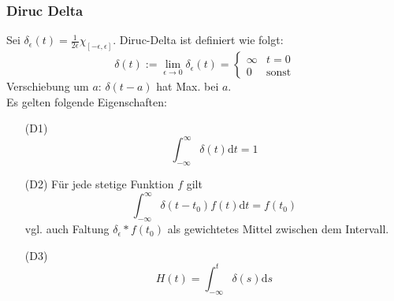 \documentclass[8pt, a4paper, landscape, fleqn]{scrartcl}
\def\d{\text{d}}
\begin{document}
\begin{multicols*}{3}
\begin{center}
\begin{tabular}{|c|c|}
            \hline
    	\end{tabular}
    	\end{center}
    	
		\subsubsection{Diruc Delta}
		Sei $\delta_\epsilon(t) = \frac{1}{2\epsilon}\chi_{[-\epsilon, \epsilon]}$. Diruc-Delta ist definiert wie folgt: $$\delta (t) := \lim_{\epsilon\to 0} \delta_\epsilon (t) = \begin{cases} \infty & t = 0 \\ 0 & \text{sonst}\end{cases}$$
		Verschiebung um $a$: $\delta (t-a)$ hat Max. bei $a$.\\
		Es gelten folgende Eigenschaften:
		\begin{itemize}[leftmargin=1cm]
              \item[(D1)] $$ \int_{-\infty}^\infty \delta(t) \d t = 1 $$
              \item[(D2)] Für jede stetige Funktion $f$ gilt $$ \int_{-\infty}^\infty \delta(t-t_0) f(t) \d t = f(t_0)$$ vgl. auch Faltung $\delta_\epsilon * f(t_0)$ als gewichtetes Mittel zwischen dem Intervall. 
              \item[(D3)] $$ H(t) = \int_{-\infty}^t \delta (s) \d s$$
        \end{itemize}
		

\end{multicols*}
\end{document}
